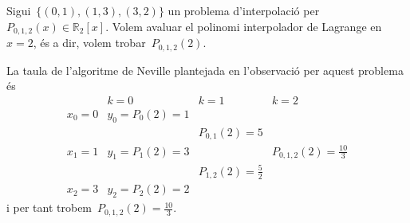 \documentclass[../../main.tex]{subfiles}
\begin{document}
	\begin{example}\label{ex:Algorisme de Neville}
		Sigui~\(\{(0,1),(1,3),(3,2)\}\) un problema d'interpolació per~\(P_{0,1,2}(x)\in\mathbb{R}_{2}[x]\).
		Volem avaluar el polinomi interpolador de Lagrange en~\(x=2\), és a dir, volem trobar~\(P_{0,1,2}(2)\).
		\begin{solution}La taula de l'algoritme de Neville plantejada en l'observació  per aquest problema és
			\[\begin{array}{c|ccc}
			& k=0 & k=1 & k=2 \\\hline
			x_{0}=0 & y_{0}=P_{0}(2)=1 & & \\
			& & P_{0,1}(2)=5 &\\
			x_{1}=1 & y_{1}=P_{1}(2)=3 & & P_{0,1,2}(2)=\frac{10}{3}\\
			& & P_{1,2}(2)=\frac{5}{2} &\\
			x_{2}=3 & y_{2}=P_{2}(2)=2 & &
			\end{array}\]
			i per tant trobem~\(P_{0,1,2}(2)=\frac{10}{3}\).
		\end{solution}
	\end{example}
\end{document}
